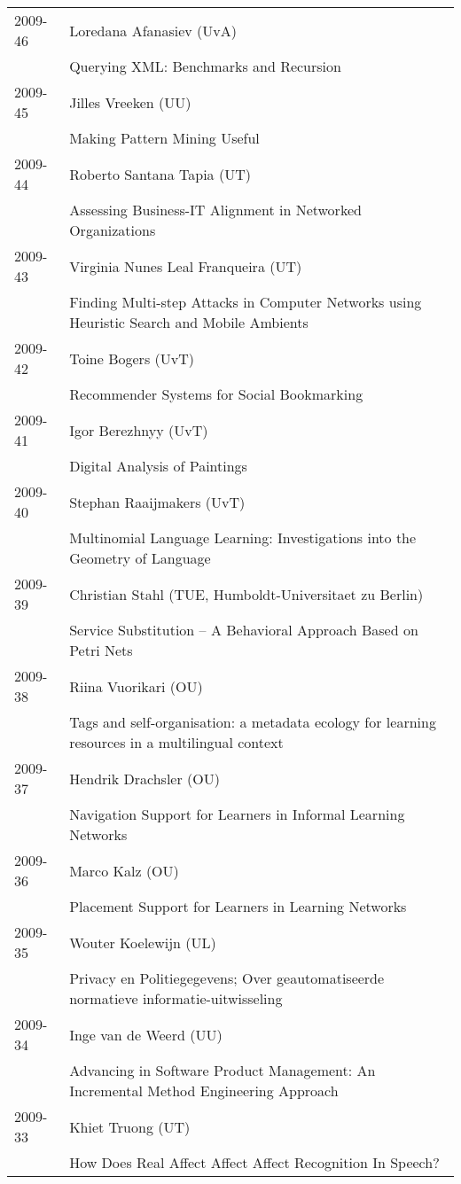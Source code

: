 \begin{longtable}{p{1.25cm}p{10.75cm}}
2009-46 & Loredana Afanasiev (UvA) \\& Querying XML: Benchmarks and Recursion \\
2009-45 & Jilles Vreeken (UU) \\& Making Pattern Mining Useful \\
2009-44 & Roberto Santana Tapia (UT) \\& Assessing Business-IT Alignment in Networked Organizations \\
2009-43 & Virginia Nunes Leal Franqueira (UT) \\& Finding Multi-step Attacks in Computer Networks using Heuristic Search and Mobile Ambients \\
2009-42 & Toine Bogers (UvT) \\& Recommender Systems for Social Bookmarking \\
2009-41 & Igor Berezhnyy (UvT) \\& Digital Analysis of Paintings \\
2009-40 & Stephan Raaijmakers (UvT) \\& Multinomial Language Learning: Investigations into the Geometry of \newline Language \\
2009-39 & Christian Stahl (TUE, Humboldt-Universitaet zu Berlin) \\& Service Substitution -- A Behavioral Approach Based on Petri Nets \\
2009-38 & Riina Vuorikari (OU) \\& Tags and self-organisation: a metadata ecology for learning resources in a multilingual context \\
2009-37 & Hendrik Drachsler (OU) \\& Navigation Support for Learners in Informal Learning Networks \\
2009-36 & Marco Kalz (OU) \\& Placement Support for Learners in Learning Networks \\
2009-35 & Wouter Koelewijn (UL) \\& Privacy en Politiegegevens; Over geautomatiseerde normatieve informatie-uitwisseling \\
2009-34 & Inge van de Weerd (UU) \\& Advancing in Software Product Management: An Incremental Method \newline Engineering Approach \\
2009-33 & Khiet Truong (UT) \\& How Does Real Affect Affect Affect Recognition In Speech? \\

\end{longtable}
